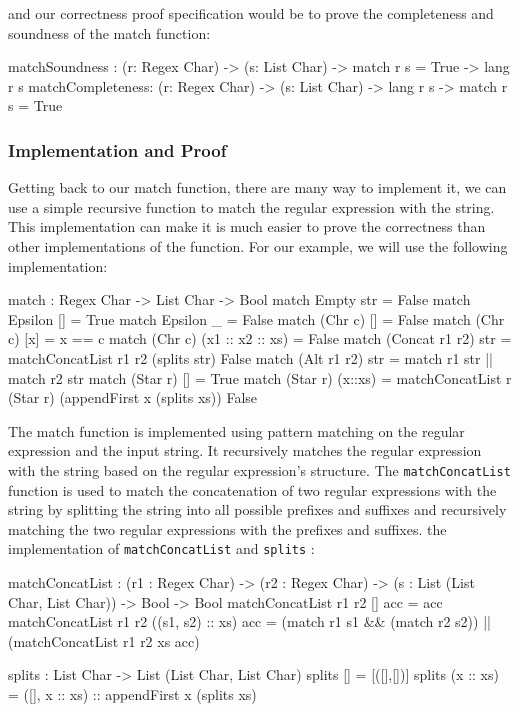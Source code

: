 \documentclass[]{rptuseminar}
\begin{document}
and our correctness proof specification would be to prove the completeness and soundness of the match function: 

\begin{idris}
  matchSoundness : (r: Regex Char) -> (s: List Char) -> match r s = True -> lang r s
  matchCompleteness: (r: Regex Char) -> (s: List Char) -> lang r s -> match r s = True
\end{idris}

\subsubsection{Implementation and Proof}
Getting back to our match function, there are many way to implement it, we can use a simple recursive function to match the regular expression with the string.
This implementation can make it is much easier to prove the correctness than other implementations of the function. For our example, we will use the following implementation:
\begin{idris}
  match : Regex Char -> List Char -> Bool
  match Empty str = False
  match Epsilon [] = True
  match Epsilon _ = False
  match (Chr c) [] = False
  match (Chr c) [x] = x == c
  match (Chr c) (x1 :: x2 :: xs) = False
  match (Concat r1 r2) str =   
    matchConcatList r1 r2 (splits str) False
  match (Alt r1 r2) str =   
    match r1 str || match r2 str  
  match (Star r) [] =  True
  match (Star r) (x::xs) =
    matchConcatList r (Star r) (appendFirst x (splits xs)) False 
\end{idris}
The match function is implemented using pattern matching on the regular expression and the input string. It recursively matches the regular expression with the string based on the regular expression's structure. The \texttt{matchConcatList} function is used to match the concatenation of two regular expressions with the string by splitting the string into all possible prefixes and suffixes and recursively matching the two regular expressions with the prefixes and suffixes.
the implementation of \texttt{matchConcatList} and \texttt{splits} :
\begin{idris}
  matchConcatList : (r1 : Regex Char) -> (r2 : Regex Char) -> 
  (s : List (List Char, List Char)) -> Bool -> Bool
  matchConcatList r1 r2 [] acc = acc
  matchConcatList r1 r2 ((s1, s2) :: xs) acc = 
    (match r1 s1 \&\& (match r2 s2)) || (matchConcatList r1 r2 xs acc)

  splits : List Char -> List (List Char, List Char)
  splits [] = [([],[])]
  splits (x :: xs) = ([], x :: xs) :: appendFirst x (splits xs)
\end{idris}
\end{document}
